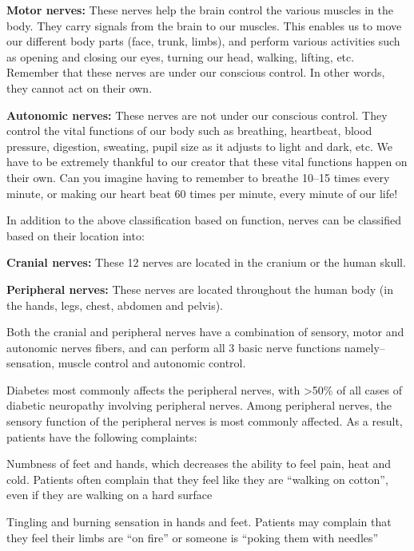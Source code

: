  \item \textbf{Motor nerves:} These nerves help the brain control the various muscles in the body. They carry signals from the brain to our muscles. This enables us to move our different body parts (face, trunk, limbs), and perform various activities such as opening and closing our eyes, turning our head, walking, lifting, etc. Remember that these nerves are under our conscious control. In other words, they cannot act on their own.

 \item \textbf{Autonomic nerves:} These nerves are not under our conscious control. They control the vital functions of our body such as breathing, heartbeat, blood pressure, digestion, sweating, pupil size as it adjusts to light and dark, etc. We have to be extremely thankful to our creator that these vital functions happen on their own. Can you imagine having to remember to breathe 10–15 times every minute, or making our heart beat 60 times per minute, every minute of our life!

In addition to the above classification based on function, nerves can be classified based on their location into:

\item \textbf{Cranial nerves:} These 12 nerves are located in the cranium or the human skull.

 \item \textbf{Peripheral nerves:} These nerves are located throughout the human body (in the hands, legs, chest, abdomen and pelvis).

Both the cranial and peripheral nerves have a combination of sensory, motor and autonomic nerves fibers, and can perform all 3 basic nerve functions namely– sensation, muscle control and autonomic control.

Diabetes most commonly affects the peripheral nerves, with \textgreater  50\% of all cases of diabetic neuropathy involving peripheral nerves. Among peripheral nerves, the sensory function of the peripheral nerves is most commonly affected. As a result, patients have the following complaints:

\item Numbness of feet and hands, which decreases the ability to feel pain, heat and cold. Patients often complain that they feel like they are “walking on cotton”, even if they are walking on a hard surface

 \item Tingling and burning sensation in hands and feet. Patients may complain that they feel their limbs are “on fire” or someone is “poking them with needles”


